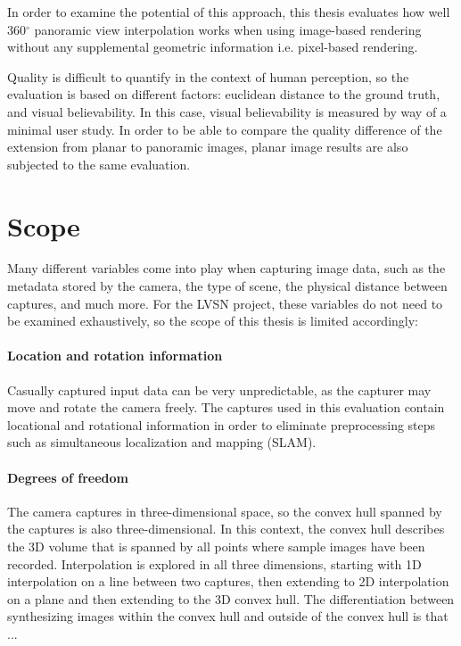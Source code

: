 In order to examine the potential of this approach, this thesis evaluates how well 360$^{\circ}$ panoramic view interpolation works when using image-based rendering without any supplemental geometric information i.e. pixel-based rendering.

Quality is difficult to quantify in the context of human perception, so the evaluation is based on different factors: euclidean distance to the ground truth, and visual believability. In this case, visual believability is measured by way of a minimal user study. In order to be able to compare the quality difference of the extension from planar to panoramic images, planar image results are also subjected to the same evaluation.

\section*{Scope}
%


Many different variables come into play when capturing image data, such as the metadata stored by the camera, the type of scene, the physical distance between captures, and much more. For the LVSN project, these variables do not need to be examined exhaustively, so the scope of this thesis is limited accordingly:

\paragraph{Location and rotation information}
Casually captured input data can be very unpredictable, as the capturer may move and rotate the camera freely. The captures used in this evaluation contain locational and rotational information in order to eliminate preprocessing steps such as simultaneous localization and mapping (SLAM).

\paragraph{Degrees of freedom}
The camera captures in three-dimensional space, so the convex hull spanned by the captures is also three-dimensional. In this context, the convex hull describes the 3D volume that is spanned by all points where sample images have been recorded. Interpolation is explored in all three dimensions, starting with 1D interpolation on a line between two captures, then extending to 2D interpolation on a plane and then extending to the 3D convex hull. The differentiation between synthesizing images within the convex hull and outside of the convex hull is that ...

